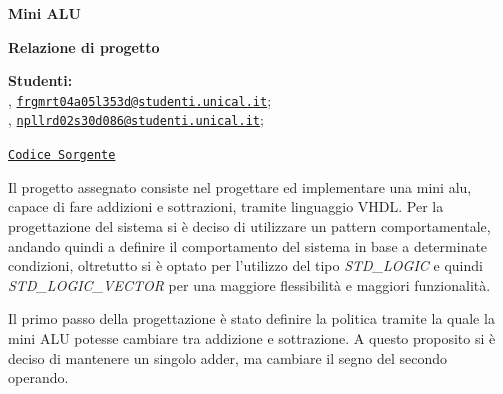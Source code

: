 



\usepackage{placeins}
\usepackage{listings}
\usepackage{xcolor}





\begin{Large}
    \textsf{\textbf{Mini ALU}}\\
\end{Large}
\textbf{Relazione di progetto}

\vspace{1ex}

\textsf{\textbf{Studenti:}} \\
, \href{frgmrt04a05l353d@studenti.unical.it}{\texttt{frgmrt04a05l353d@studenti.unical.it}};\\
, \href{npllrd02s30d086@studenti.unical.it} {\texttt{npllrd02s30d086@studenti.unical.it}};

\href{https://github.com/Zi0LEO/elettronica_digitale}{\texttt{Codice Sorgente}}


\vspace{2ex}

Il progetto assegnato consiste nel progettare ed implementare una mini alu, capace di fare addizioni e sottrazioni, tramite linguaggio VHDL.
Per la progettazione del sistema si è deciso di utilizzare un pattern comportamentale, andando quindi a definire il comportamento del sistema in base a determinate condizioni, oltretutto si è optato per l'utilizzo del tipo \textit{STD\_LOGIC} e quindi \textit{STD\_LOGIC\_VECTOR} per una maggiore flessibilità e maggiori funzionalità.

Il primo passo della progettazione è stato definire la politica tramite la quale la mini ALU potesse cambiare tra addizione e sottrazione. A questo proposito si è deciso di mantenere un singolo adder, ma cambiare
il segno del secondo operando.

